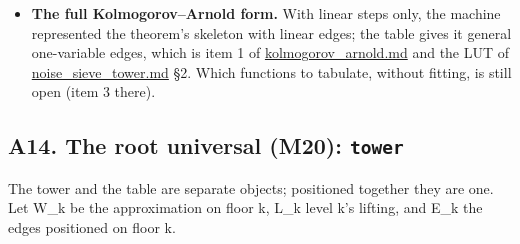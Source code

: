 \begin{itemize}
\begin{itemize}
\item \textbf{Proved} (\texttt{knf\_\allowbreak{}identity}, 23 checks, 0 failed): the knf of the nbody lattice (64³, 177 frames) against spatial null permutations. The host's walk equals the engine's knf at every voxel, and a single flipped bit leaves it unchanged exactly where the window rule says (1,500 of 8,192): the knf is many-to-one. The 48 exact cube motions carry the knf and retain its entangled entropy E and its cloud. The whole is its tiles plus its seams at every tile size. Alike-voxel controls are identified within 5σ of 1/20. \textbf{Measured:} E is 44.6 times the free null's mean, the inside and between departure curves cross between tiles of 2 and 4 and sum to 0.590 at 4, and each body's box has its own curve. Written in \hyperref[chap:two-crystals]{two\_\allowbreak{}crystals.md}.
\end{itemize}
\item \textbf{The full Kolmogorov–Arnold form.} With linear steps only, the machine represented the theorem's skeleton with linear edges; the table gives it general one-variable edges, which is item 1 of \hyperref[chap:kolmogorov-arnold]{kolmogorov\_\allowbreak{}arnold.md} and the LUT of \hyperref[chap:noise-sieve-tower]{noise\_\allowbreak{}sieve\_\allowbreak{}tower.md} §2. Which functions to tabulate, without fitting, is still open (item 3 there).
\end{itemize}

\subsection{\texorpdfstring{A14. The root universal (M20): \texttt{tower}}{A14. The root universal (M20): tower}}

The tower and the table are separate objects; positioned together they are one. Let W\_\allowbreak{}k be the approximation on floor k, L\_\allowbreak{}k level k's lifting, and E\_\allowbreak{}k the edges positioned on floor k.

